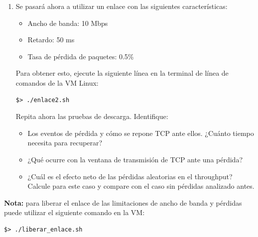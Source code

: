 \documentclass[a4paper,10pt]{article}
\begin{document}
\begin{enumerate}
    \item Se pasará ahora a utilizar un enlace con las siguientes características:
        \begin{itemize}
        \item Ancho de banda: 10 Mbps
        \item Retardo: 50 ms
        \item Tasa de pérdida de paquetes: 0.5\%
        \end{itemize}

Para obtener esto, ejecute la siguiente línea en la terminal de línea de comandos de la VM Linux:
   \begin{verbatim}
$> ./enlace2.sh
    \end{verbatim}

Repita ahora las pruebas de descarga. Identifique:
\begin{itemize}
    \item Los eventos de pérdida y cómo se repone TCP ante ellos. ¿Cuánto tiempo necesita para recuperar?
    \item ¿Qué ocurre con la ventana de transmisión de TCP ante una pérdida?
    \item ¿Cuál es el efecto neto de las pérdidas aleatorias en el throughput? Calcule para este caso y compare con el caso sin pérdidas analizado antes.
\end{itemize} 
\end{enumerate}


\textbf{Nota:} para liberar el enlace de las limitaciones de ancho de banda y pérdidas puede utilizar el siguiente comando en la VM:
\begin{verbatim}
$> ./liberar_enlace.sh
\end{verbatim}
\end{document}
